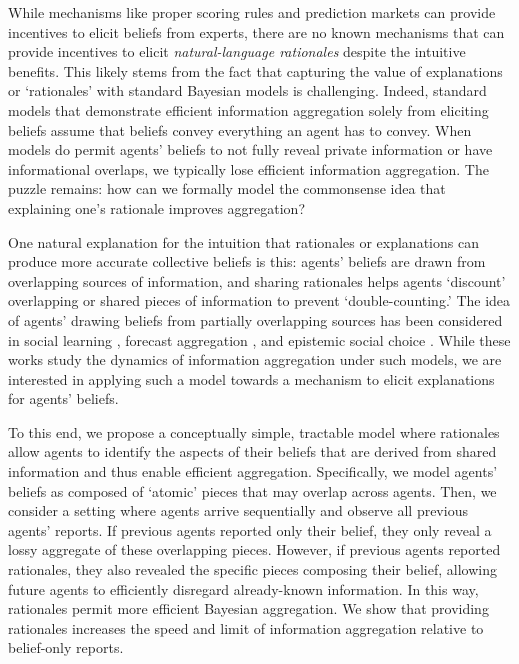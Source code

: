 \documentclass{winnower}
\begin{document}
While mechanisms like proper scoring rules \citep{gneiting2007strictly} and prediction markets \citep{wolfers2004prediction} can provide incentives to elicit beliefs from experts, there are no known mechanisms that can provide incentives to elicit \emph{natural-language rationales} despite the intuitive benefits. This likely stems from the fact that capturing the value of explanations or `rationales' with standard Bayesian models is challenging. Indeed, standard models that demonstrate efficient information aggregation solely from eliciting beliefs assume that beliefs convey everything an agent has to convey. When models do permit agents' beliefs to not fully reveal private information or have informational overlaps, we typically lose efficient information aggregation. The puzzle remains: how can we formally model the commonsense idea that explaining one’s rationale improves aggregation?


One natural explanation for the intuition that rationales or explanations can produce more accurate collective beliefs is this: agents' beliefs are drawn from overlapping sources of information, and sharing rationales helps agents `discount' overlapping or shared pieces of information to prevent `double-counting.' The idea of agents' drawing beliefs from partially overlapping sources has been considered in social learning \citep{dasaratha2019aggregative}, forecast aggregation \citep{satopaa2017partial, babichenko2021learning}, and epistemic social choice \citep{ding2021deliberation, dietrich2024deliberation}. While these works study the dynamics of information aggregation under such models, we are interested in applying such a model towards a mechanism to elicit explanations for agents' beliefs.

To this end, we propose a conceptually simple, tractable model where rationales allow agents to identify the aspects of their beliefs that are derived from shared information and thus enable efficient aggregation. Specifically, we model agents' beliefs as composed of `atomic' pieces that may overlap across agents. Then, we consider a setting where agents arrive sequentially and observe all previous agents' reports. If previous agents reported only their belief, they only reveal a lossy aggregate of these overlapping pieces. However, if previous agents reported rationales, they also revealed the specific pieces composing their belief, allowing future agents to efficiently disregard already-known information. In this way, rationales permit more efficient Bayesian aggregation. We show that providing rationales increases the speed and limit of information aggregation relative to belief-only reports.
\end{document}
